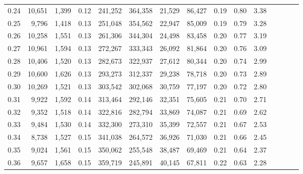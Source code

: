 \begin{tabular}{rrrcrrrrrrrrrrr}
0.24 &  10,651 &  1,399 &                                       0.12 &  241,252 &  364,358 &   21,529 &   86,427 &  0.19 &  0.80 &                         3.38 \\
0.25 &   9,796 &  1,418 &                                       0.13 &  251,048 &  354,562 &   22,947 &   85,009 &  0.19 &  0.79 &                         3.28 \\
0.26 &  10,258 &  1,551 &                                       0.13 &  261,306 &  344,304 &   24,498 &   83,458 &  0.20 &  0.77 &                         3.19 \\
0.27 &  10,961 &  1,594 &                                       0.13 &  272,267 &  333,343 &   26,092 &   81,864 &  0.20 &  0.76 &                         3.09 \\
0.28 &  10,406 &  1,520 &                                       0.13 &  282,673 &  322,937 &   27,612 &   80,344 &  0.20 &  0.74 &                         2.99 \\
0.29 &  10,600 &  1,626 &                                       0.13 &  293,273 &  312,337 &   29,238 &   78,718 &  0.20 &  0.73 &                         2.89 \\
0.30 &  10,269 &  1,521 &                                       0.13 &  303,542 &  302,068 &   30,759 &   77,197 &  0.20 &  0.72 &                         2.80 \\
0.31 &   9,922 &  1,592 &                                       0.14 &  313,464 &  292,146 &   32,351 &   75,605 &  0.21 &  0.70 &                         2.71 \\
0.32 &   9,352 &  1,518 &                                       0.14 &  322,816 &  282,794 &   33,869 &   74,087 &  0.21 &  0.69 &                         2.62 \\
0.33 &   9,484 &  1,530 &                                       0.14 &  332,300 &  273,310 &   35,399 &   72,557 &  0.21 &  0.67 &                         2.53 \\
0.34 &   8,738 &  1,527 &                                       0.15 &  341,038 &  264,572 &   36,926 &   71,030 &  0.21 &  0.66 &                         2.45 \\
0.35 &   9,024 &  1,561 &                                       0.15 &  350,062 &  255,548 &   38,487 &   69,469 &  0.21 &  0.64 &                         2.37 \\
0.36 &   9,657 &  1,658 &                                       0.15 &  359,719 &  245,891 &   40,145 &   67,811 &  0.22 &  0.63 &                         2.28 \\

\end{tabular}

